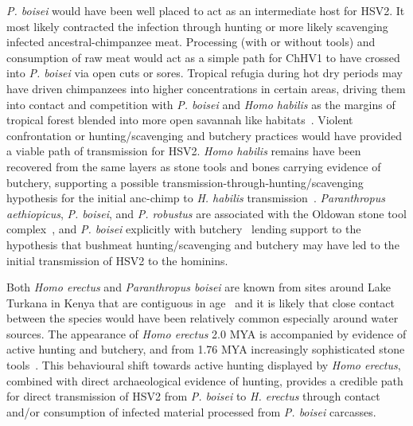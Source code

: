 \documentclass[fleqn,10pt]{wlscirep}
\begin{document}
\textit{P. boisei} would have been well placed to act as an intermediate host for HSV2. It most likely contracted the infection through hunting or more likely scavenging infected ancestral-chimpanzee meat. Processing (with or without tools) and consumption of raw meat would act as a simple path for ChHV1 to have crossed into \textit{P. boisei} via open cuts or sores. Tropical refugia during hot dry periods may have driven chimpanzees into higher concentrations in certain areas, driving them into contact and competition with \textit{P. boisei} and \textit{Homo habilis} as the margins of tropical forest blended into more open savannah like habitats~\citep{Julier2017}. Violent confrontation or hunting/scavenging and butchery practices would have provided a viable path of transmission for HSV2. \textit{Homo habilis} remains have been recovered from the same layers as stone tools and bones carrying evidence of butchery, supporting a possible transmission-through-hunting/scavenging hypothesis for the initial anc-chimp to \textit{H. habilis} transmission~\citep{Clarke2012}. \textit{Paranthropus aethiopicus}, \textit{P. boisei}, and \textit{P. robustus} are associated with the Oldowan stone tool complex~\citep{DeHeinzelin1999}, and \textit{P. boisei} explicitly with butchery~\citep{Dominguez-Rodrigo2013} lending support to the hypothesis that bushmeat hunting/scavenging and butchery may have led to the initial transmission of HSV2 to the hominins. 

Both \textit{Homo erectus} and \textit{Paranthropus boisei} are known from sites around Lake Turkana in Kenya that are contiguous in age~\citep{Anton2016, Wood2007} and it is likely that close contact between the species would have been relatively common especially around water sources. The appearance of \textit{Homo erectus} 2.0 MYA is accompanied by evidence of active hunting and butchery, and from 1.76 MYA increasingly sophisticated stone tools~\citep{Cachel1998}. This behavioural shift towards active hunting displayed by \textit{Homo erectus}, combined with direct archaeological evidence of hunting, provides a credible path for direct transmission of HSV2 from \textit{P. boisei} to \textit{H. erectus} through contact and/or consumption of infected material processed from \textit{P. boisei} carcasses.
\end{document}
